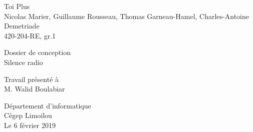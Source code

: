 \begin{titlepage}
	\centering
	
	{\huge Toi Plus} \\
    Nicolas Marier,
    Guillaume Rousseau,
    Thomas Garneau-Hamel,
    Charles-Antoine Demetriade \\
    420-204-RE, gr.1
    
    \vspace{6 cm}
    
    \huge{Dossier de conception} \\
    \large{Silence radio}
    
    \vspace{4 cm}
    
    Travail présenté à \\
    M. Walid Boulabiar
    
    \vspace{8 cm}
    
    Département d'informatique \\
    Cégep Limoilou \\
    Le 6 février 2019
\end{titlepage}